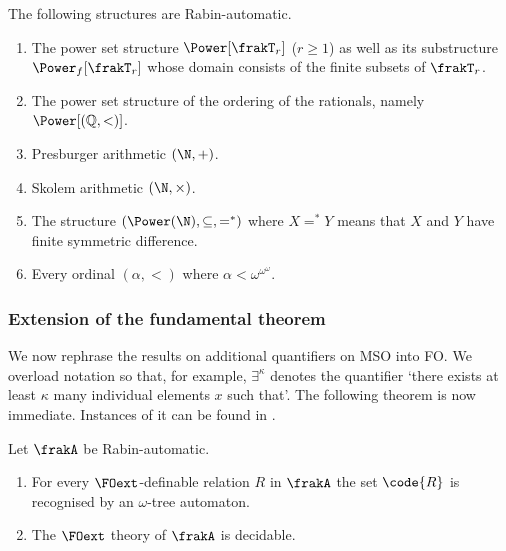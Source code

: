 \begin{example}
 The following structures are Rabin-automatic.
\begin{enumerate}
 \item The power set structure $\Power[\frakT_r]$ ($r \geq 1$) as well as its substructure $\Power_f[\frakT_r]$ whose domain consists of the finite subsets of $\frakT_r$.
 \item The power set structure of the ordering of the rationals, namely $\Power[(\mathbb{Q},<)]$.
 \item Presburger arithmetic $(\N,+)$.
 \item Skolem arithmetic $(\N,\times)$.
 \item The structure $(\Power(\N),\subseteq, =^*)$ where $X =^* Y$ means that $X$ and $Y$ have finite symmetric difference.
 \item Every ordinal $(\alpha,<)$ where $\alpha < \omega^{\omega^\omega}$.
\end{enumerate}





\end{example}
\subsubsection*{Extension of the fundamental theorem}

We now rephrase the results on additional quantifiers on MSO into FO. We overload notation so that, for example, $\exists^\kappa$ denotes the quantifier `there exists at least $\kappa$ many individual elements $x$ such that'. The following theorem is now immediate. Instances of it can be found in \cite{BlGr00,KRS04,KuLo05}.

\begin{theorem} \label{AS:thm:FOext}
Let $\frakA$ be Rabin-automatic.
\begin{enumerate}
\item For every $\FOext$-definable relation $R$ in $\frakA$ the set $\code{R}$ is recognised by an $\omega$-tree  automaton.
\item The $\FOext$ theory of $\frakA$ is decidable.
\end{enumerate}
\end{theorem}

